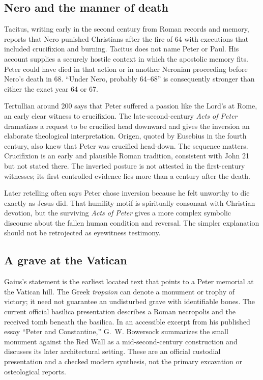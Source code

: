 \subsection{Nero and the manner of death}

Tacitus, writing early in the second century from Roman records and memory,
reports that Nero punished Christians after the fire of 64 with executions
that included crucifixion and burning. Tacitus does not name Peter or Paul.
His account supplies a securely hostile context in which the apostolic memory
fits. Peter could have died in that action or in another Neronian proceeding
before Nero's death in 68. ``Under Nero, probably 64--68'' is consequently
stronger than either the exact year 64 or 67.

Tertullian around 200 says that Peter suffered a passion like the Lord's at
Rome, an early clear witness to crucifixion. The late-second-century
\emph{Acts of Peter} dramatizes a request to be crucified head downward and
gives the inversion an elaborate theological interpretation. Origen, quoted
by Eusebius in the fourth century, also knew that Peter was crucified
head-down. The sequence matters. Crucifixion is an early and plausible Roman
tradition, consistent with John 21 but not stated there. The inverted posture
is not attested in the first-century witnesses; its first controlled evidence
lies more than a century after the death.

Later retelling often says Peter chose inversion because he felt unworthy to
die exactly as Jesus did. That humility motif is spiritually consonant with
Christian devotion, but the surviving \emph{Acts of Peter} gives a more
complex symbolic discourse about the fallen human condition and reversal.
The simpler explanation should not be retrojected as eyewitness testimony.

\subsection{A grave at the Vatican}

Gaius's statement is the earliest located text that points to a Peter memorial
at the Vatican hill. The Greek \emph{tropaion} can denote a monument or trophy
of victory; it need not guarantee an undisturbed grave with identifiable
bones. The current official basilica presentation describes a Roman necropolis
and the received tomb beneath the basilica. In an accessible excerpt from his
published essay ``Peter and Constantine,'' G.~W. Bowersock summarizes the
small monument against the Red Wall as a mid-second-century construction and
discusses its later architectural setting. These are an official custodial
presentation and a checked modern synthesis, not the primary excavation or
osteological reports.

